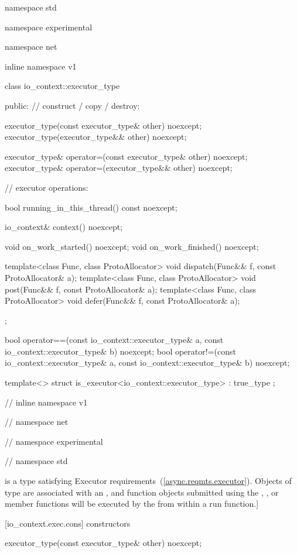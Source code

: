 \begin{codeblock}
namespace std {
namespace experimental {
namespace net {
inline namespace v1 {

  class io_context::executor_type
  {
  public:
    // construct / copy / destroy:

    executor_type(const executor_type& other) noexcept;
    executor_type(executor_type&& other) noexcept;

    executor_type& operator=(const executor_type& other) noexcept;
    executor_type& operator=(executor_type&& other) noexcept;

    // executor operations:

    bool running_in_this_thread() const noexcept;

    io_context& context() noexcept;

    void on_work_started() noexcept;
    void on_work_finished() noexcept;

    template<class Func, class ProtoAllocator>
      void dispatch(Func&& f, const ProtoAllocator& a);
    template<class Func, class ProtoAllocator>
      void post(Func&& f, const ProtoAllocator& a);
    template<class Func, class ProtoAllocator>
      void defer(Func&& f, const ProtoAllocator& a);
  };

  bool operator==(const io_context::executor_type& a,
                  const io_context::executor_type& b) noexcept;
  bool operator!=(const io_context::executor_type& a,
                  const io_context::executor_type& b) noexcept;

  template<> struct is_executor<io_context::executor_type> : true_type {};

} // inline namespace v1
} // namespace net
} // namespace experimental
} // namespace std
\end{codeblock}

\pnum
{} is a type satisfying Executor requirements~(\ref{async.reqmts.executor}). Objects of type  are associated with an , and function objects submitted using the , , or  member functions will be executed by the  from within a run function.]


[io_context.exec.cons]{ constructors}

\begin{itemdecl}
executor_type(const executor_type& other) noexcept;
\end{itemdecl}

